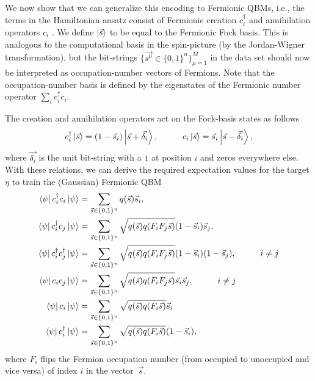 \documentclass[
    reprint,
    aps,
    prx,
    longbibliography
]{revtex4-2}
\begin{document}
We now show that we can generalize this encoding to Fermionic QBMs, i.e., the terms in the Hamiltonian ansatz consist of Fermionic creation $c_i^\dagger$ and annihilation operators $c_i$ . We define $\ket{\vec{s}}$ to be equal to the Fermionic Fock basis. This is analogous to the computational basis in the spin-picture (by the Jordan-Wigner transformation), but the bit-strings $\{\vec{s^\mu}\in\{0,1\}^n\}_{\mu=1}^M$ in the data set should now be interpreted as occupation-number vectors of Fermions. Note that the occupation-number basis is defined by the eigenstates of the Fermionic number operator $\sum_i c^\dagger_i c_i$. 

The creation and annihilation operators act on the Fock-basis states as follows 
\begin{equation} 
    c^\dagger_i \ket{\vec{s}} = (1-\vec{s}_i)\ket{\vec{s}+\vec{\delta_i}}, \hspace{1cm} c_i \ket{\vec{s}} = \vec{s}_i\ket{\vec{s}-\vec{\delta_i}},
\end{equation} 
where $\vec{\delta_i}$ is the unit bit-string with a $1$ at position $i$ and zeros everywhere else. With these relations, we can derive the required expectation values for the target $\eta$ to train the (Gaussian) Fermionic QBM   
\begin{align}
\begin{split}
    \bra{\psi} c^\dagger_i c_i \ket{\psi} &= \sum_{\vec{s}\in\{0,1\}^n}q(\vec{s})\vec{s}_i, \\
    \bra{\psi} c^\dagger_i c_j \ket{\psi} &= \sum_{\vec{s}\in\{0,1\}^n}\sqrt{q(\vec{s})q(F_i F_j\vec{s})}(1-\vec{s}_i)\vec{s}_j,
    \\
    \bra{\psi} c^\dagger_i c^\dagger_j \ket{\psi} &= \sum_{\vec{s}\in\{0,1\}^n}\sqrt{q(\vec{s})q(F_i F_j\vec{s})}(1-\vec{s}_i)(1-\vec{s}_j), \hspace{1cm} i\neq j
    \\
    \bra{\psi} c_i c_j \ket{\psi} &= \sum_{\vec{s}\in\{0,1\}^n}\sqrt{q(\vec{s})q(F_i F_j\vec{s})}\vec{s}_i\vec{s}_j, \hspace{1cm} i\neq j
    \\
    \bra{\psi} c_i\ket{\psi} &= \sum_{\vec{s}\in\{0,1\}^n}\sqrt{q(\vec{s})q(F_i \vec{s})}\vec{s}_i
    \\
    \bra{\psi} c_i^\dagger\ket{\psi} &= \sum_{\vec{s}\in\{0,1\}^n}\sqrt{q(\vec{s})q(F_i \vec{s})}(1-\vec{s}_i),
\end{split}
\end{align} 
where $F_i$ flips the Fermion occupation number (from occupied to unoccupied and vice versa) of index $i$ in the vector~$\vec{s}$. 
\end{document}
